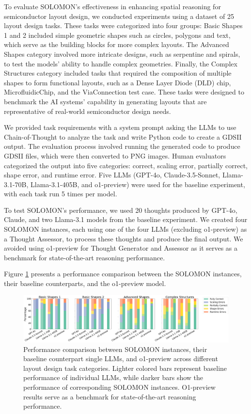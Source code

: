 \documentclass{article}
\begin{document}
To evaluate SOLOMON's effectiveness in enhancing spatial reasoning for semiconductor layout design, we conducted experiments using a dataset of 25 layout design tasks. These tasks were categorized into four groups: Basic Shapes 1 and 2 included simple geometric shapes such as circles, polygons and text, which serve as the building blocks for more complex layouts. The Advanced Shapes category involved more intricate designs, such as serpentine and spirals, to test the models' ability to handle complex geometries. Finally, the Complex Structures category included tasks that required the composition of multiple shapes to form functional layouts, such as a Dense Layer Diode (DLD) chip, MicrofluidicChip, and the ViaConnection test case. These tasks were designed to benchmark the AI systems' capability in generating layouts that are representative of real-world semiconductor design needs.

We provided task requirements with a system prompt asking the LLMs to use Chain-of-Thought to analyze the task and write Python code to create a GDSII output. The evaluation process involved running the generated code to produce GDSII files, which were then converted to PNG images. Human evaluators categorized the output into five categories: correct, scaling error, partially correct, shape error, and runtime error. Five LLMs (GPT-4o, Claude-3.5-Sonnet, Llama-3.1-70B, Llama-3.1-405B, and o1-preview) were used for the baseline experiment, with each task run 5 times per model.

To test SOLOMON's performance, we used 20 thoughts produced by GPT-4o, Claude, and two Llama-3.1 models from the baseline experiment. We created four SOLOMON instances, each using one of the four LLMs (excluding o1-preview) as a Thought Assessor, to process these thoughts and produce the final output. We avoided using o1-preview for Thought Generator and Assessor as it serves as a benchmark for state-of-the-art reasoning performance.

Figure \ref{fig:performance_comparison} presents a performance comparison between the SOLOMON instances, their baseline counterparts, and the o1-preview model.

\begin{figure}[h]
  \centering
  \includegraphics[width=\textwidth]{output.png}
  \caption{Performance comparison between SOLOMON instances, their baseline counterpart single LLMs, and o1-preview across different layout design task categories. Lighter colored bars represent baseline performance of individual LLMs, while darker bars show the performance of corresponding SOLOMON instances. O1-preview results serve as a benchmark for state-of-the-art reasoning performance.}
  \label{fig:performance_comparison}
\end{figure}
\end{document}
